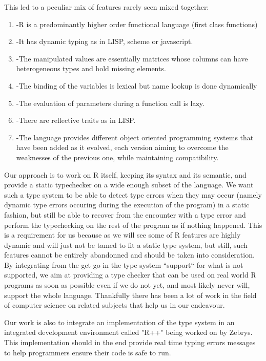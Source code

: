This led to a peculiar mix of features rarely seen mixed together:
\begin{enumerate}
\item[]-R is a predominantly higher order functional language (first class functions)
\item[]-It has dynamic typing as in LISP, scheme or javascript.
\item[]-The manipulated values are essentially matrices whose columns can have heterogeneous types and hold missing elements.
\item[]-The binding of the variables is lexical but name lookup is done dynamically
\item[]-The evaluation of parameters during a function call is lazy.
\item[]-There are reflective traits as in LISP.
\item[]-The language provides different object oriented programming systems that have been added as it evolved, each version aiming to overcome the weaknesses of the previous one, while maintaining compatibility.
\end{enumerate}

Our approach is to work on R itself, keeping its syntax and its semantic, and provide a static typechecker on a wide enough subset of the language. We want such a type system to be able to detect type errors when they may occur (namely dynamic type errors occuring during the execution of the program) in a static fashion, but still be able to recover from the encounter with a type error and  perform the typechecking on the rest of the program as if nothing happened. This is a requirement for us because as we will see some of R features are highly dynamic and will just not be tamed to fit a static type system, but still, such features cannot be entirely abandonned and should be taken into consideration. By integrating from the get go in the type system ``support`` for what is not supported, we aim at providing a type checker that can be used on real world R programs as soon as possible even if we do not yet, and most likely never will, support the whole language. Thankfully there has been a lot of work in the field of computer science on related subjects that help us in our endeavour.

Our work is also to integrate an implementation of the type system in an integrated development environment called "R++" being worked on by Zebrys. This implementation should in the end provide real time typing errors messages to help programmers ensure their code is safe to run.


